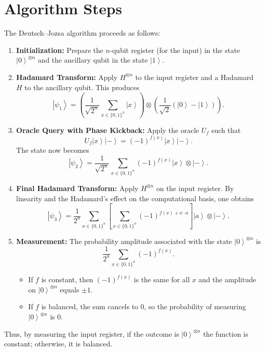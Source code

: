 \documentclass[11pt,oneside]{book}
\theoremstyle{remark}
\renewcommand{\ket}[1]{\left|#1\right\rangle}      %
\begin{document}
	\section{Algorithm Steps}
	The Deutsch--Jozsa algorithm proceeds as follows:
	\begin{enumerate}[label=\textbf{Step \arabic*:}, leftmargin=*, align=left]
		\item \textbf{Initialization:}  
		Prepare the \( n \)-qubit register (for the input) in the state \( \ket{0}^{\otimes n} \) and the ancillary qubit in the state \( \ket{1} \).  
		\item \textbf{Hadamard Transform:}  
		Apply \( H^{\otimes n} \) to the input register and a Hadamard \( H \) to the ancillary qubit. This produces  
		\[
		\ket{\psi_1} = \left(\frac{1}{\sqrt{2^n}} \sum_{x \in \{0,1\}^n} \ket{x}\right) \otimes \left(\frac{1}{\sqrt{2}}(\ket{0}-\ket{1})\right).
		\]
		\item \textbf{Oracle Query with Phase Kickback:}  
		Apply the oracle \( U_f \) such that  
		\[
		U_f \ket{x}\ket{-} = (-1)^{f(x)} \ket{x}\ket{-}.
		\]
		The state now becomes  
		\[
		\ket{\psi_2} = \frac{1}{\sqrt{2^n}} \sum_{x \in \{0,1\}^n} (-1)^{f(x)} \ket{x} \otimes \ket{-}.
		\]
		\item \textbf{Final Hadamard Transform:}  
		Apply \( H^{\otimes n} \) on the input register. By linearity and the Hadamard's effect on the computational basis, one obtains  
		\[
		\ket{\psi_3} = \frac{1}{2^n} \sum_{a \in \{0,1\}^n} \left[\sum_{x \in \{0,1\}^n} (-1)^{f(x) + x \cdot a}\right] \ket{a} \otimes \ket{-}.
		\]
		\item \textbf{Measurement:}  
		The probability amplitude associated with the state \( \ket{0}^{\otimes n} \) is  
		\[
		\frac{1}{2^n} \sum_{x \in \{0,1\}^n} (-1)^{f(x)}.
		\]
		\begin{itemize}[leftmargin=*, labelsep=5mm]
			\item If \( f \) is constant, then \( (-1)^{f(x)} \) is the same for all \( x \) and the amplitude on \( \ket{0}^{\otimes n} \) equals \( \pm 1 \).
			\item If \( f \) is balanced, the sum cancels to \( 0 \), so the probability of measuring \( \ket{0}^{\otimes n} \) is \( 0 \).
		\end{itemize}
	\end{enumerate}
	
	Thus, by measuring the input register, if the outcome is \( \ket{0}^{\otimes n} \) the function is constant; otherwise, it is balanced.
	
\end{document}
